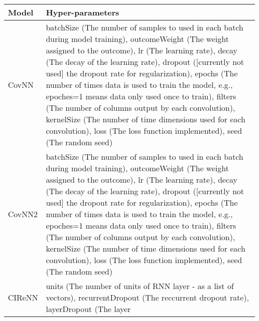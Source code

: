 \documentclass[
]{article}
\begin{document}
\begin{longtable}[]{@{}ll@{}}
\toprule
\begin{minipage}[b]{0.11\columnwidth}\raggedright
Model\strut
\end{minipage} & \begin{minipage}[b]{0.83\columnwidth}\raggedright
Hyper-parameters\strut
\end{minipage}\tabularnewline
\midrule
\endhead
\begin{minipage}[t]{0.11\columnwidth}\raggedright
CovNN\strut
\end{minipage} & \begin{minipage}[t]{0.83\columnwidth}\raggedright
batchSize (The number of samples to used in each batch during model
training), outcomeWeight (The weight assigned to the outcome), lr (The
learning rate), decay (The decay of the learning rate), dropout
({[}currently not used{]} the dropout rate for regularization), epochs
(The number of times data is used to train the model, e.g., epoches=1
means data only used once to train), filters (The number of columns
output by each convolution), kernelSize (The number of time dimensions
used for each convolution), loss (The loss function implemented), seed
(The random seed)\strut
\end{minipage}\tabularnewline
\begin{minipage}[t]{0.11\columnwidth}\raggedright
CovNN2\strut
\end{minipage} & \begin{minipage}[t]{0.83\columnwidth}\raggedright
batchSize (The number of samples to used in each batch during model
training), outcomeWeight (The weight assigned to the outcome), lr (The
learning rate), decay (The decay of the learning rate), dropout
({[}currently not used{]} the dropout rate for regularization), epochs
(The number of times data is used to train the model, e.g., epoches=1
means data only used once to train), filters (The number of columns
output by each convolution), kernelSize (The number of time dimensions
used for each convolution), loss (The loss function implemented), seed
(The random seed)\strut
\end{minipage}\tabularnewline
\begin{minipage}[t]{0.11\columnwidth}\raggedright
CIReNN\strut
\end{minipage} & \begin{minipage}[t]{0.83\columnwidth}\raggedright
units (The number of units of RNN layer - as a list of vectors),
recurrentDropout (The reccurrent dropout rate), layerDropout (The layer

\end{minipage}
\end{longtable}
\end{document}
